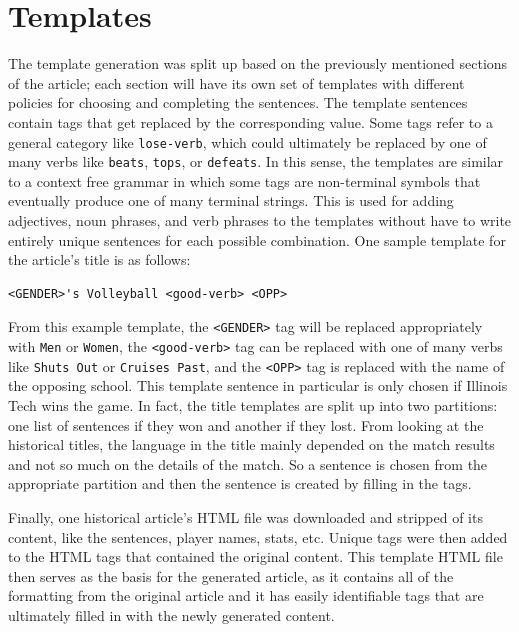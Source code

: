 \documentclass{article}
\begin{document}
\section{Templates}
The template generation was split up based on the previously mentioned sections of the article; each section will have its own set of templates with different policies for choosing and completing the sentences. The template sentences contain tags that get replaced by the corresponding value. Some tags refer to a general category like \texttt{lose-verb}, which could ultimately be replaced by one of many verbs like \texttt{beats}, \texttt{tops}, or \texttt{defeats}. In this sense, the templates are similar to a context free grammar in which some tags are non-terminal symbols that eventually produce one of many terminal strings. This is used for adding adjectives, noun phrases, and verb phrases to the templates without have to write entirely unique sentences for each possible combination. One sample template for the article's title is as follows:
\begin{verbatim}
<GENDER>'s Volleyball <good-verb> <OPP>
\end{verbatim}

From this example template, the \texttt{<GENDER>} tag will be replaced appropriately with \texttt{Men} or \texttt{Women}, the \texttt{<good-verb>} tag can be replaced with one of many verbs like \texttt{Shuts Out} or \texttt{Cruises Past}, and the \texttt{<OPP>} tag is replaced with the name of the opposing school. This template sentence in particular is only chosen if Illinois Tech wins the game. In fact, the title templates are split up into two partitions: one list of sentences if they won and another if they lost. From looking at the historical titles, the language in the title mainly depended on the match results and not so much on the details of the match. So a sentence is chosen from the appropriate partition and then the sentence is created by filling in the tags. 

Finally, one historical article's HTML file was downloaded and stripped of its content, like the sentences, player names, stats, etc. Unique tags were then added to the HTML tags that contained the original content. This template HTML file then serves as the basis for the generated article, as it contains all of the formatting from the original article and it has easily identifiable tags that are ultimately filled in with the newly generated content.
\end{document}
